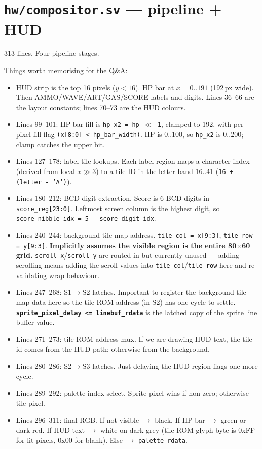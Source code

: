 \documentclass[11pt,letterpaper]{article}
\begin{document}
\section{\texttt{hw/compositor.sv} --- pipeline + HUD}

313 lines. Four pipeline stages.

Things worth memorising for the Q\&A:

\begin{itemize}[leftmargin=*]
  \item HUD strip is the top 16 pixels ($y < 16$). HP bar at $x = 0..191$
    (192\,px wide). Then AMMO/WAVE/ART/GAS/SCORE labels and digits. Lines
    36--66 are the layout constants; lines 70--73 are the HUD colours.
  \item Lines 99--101: HP bar fill is \texttt{hp\_x2 = hp $\ll$ 1}, clamped
    to 192, with per-pixel fill flag \texttt{(x[8:0] < hp\_bar\_width)}.
    HP is 0..100, so \texttt{hp\_x2} is 0..200; clamp catches the upper bit.
  \item Lines 127--178: label tile lookups. Each label region maps a
    character index (derived from local-$x \gg 3$) to a tile ID in the
    letter band 16..41 (\texttt{16 + (letter - 'A')}).
  \item Lines 180--212: BCD digit extraction. Score is 6 BCD digits in
    \texttt{score\_reg[23:0]}. Leftmost screen column is the highest
    digit, so \texttt{score\_nibble\_idx = 5 - score\_digit\_idx}.
  \item Lines 240--244: background tile map address.
    \texttt{tile\_col = x[9:3]}, \texttt{tile\_row = y[9:3]}.
    \textbf{Implicitly assumes the visible region is the entire 80$\times$60
    grid.} \texttt{scroll\_x}/\texttt{scroll\_y} are routed in but currently
    unused --- adding scrolling means adding the scroll values into
    \texttt{tile\_col}/\texttt{tile\_row} here and re-validating wrap
    behaviour.
  \item Lines 247--268: S1$\to$S2 latches. Important to register the
    background tile map data here so the tile ROM address (in S2) has one
    cycle to settle. \textbf{\texttt{sprite\_pixel\_delay <= linebuf\_rdata}}
    is the latched copy of the sprite line buffer value.
  \item Lines 271--273: tile ROM address mux. If we are drawing HUD text,
    the tile id comes from the HUD path; otherwise from the background.
  \item Lines 280--286: S2$\to$S3 latches. Just delaying the HUD-region
    flags one more cycle.
  \item Lines 289--292: palette index select. Sprite pixel wins if non-zero;
    otherwise tile pixel.
  \item Lines 296--311: final RGB. If not visible $\to$ black. If HP bar
    $\to$ green or dark red. If HUD text $\to$ white on dark grey (tile
    ROM glyph byte is 0xFF for lit pixels, 0x00 for blank). Else $\to$
    \texttt{palette\_rdata}.
\end{itemize}
\end{document}
